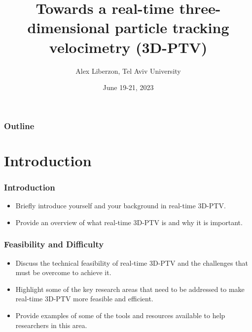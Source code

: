 \documentclass[aspectratio=43]{beamer}
\title{Towards a real-time three-dimensional particle tracking velocimetry (3D-PTV)}
\date{June 19-21, 2023}
\author[Liberzon]{Alex Liberzon, Tel Aviv University}
\begin{document}
\begin{frame}
    \titlepage
\end{frame}

\begin{frame}\frametitle{Outline}
    \begin{card}	
    \tableofcontents
    \end{card}
\end{frame}


\section{Introduction}

\begin{frame}
\frametitle{Introduction}
\begin{itemize}
\item Briefly introduce yourself and your background in real-time 3D-PTV.
\item Provide an overview of what real-time 3D-PTV is and why it is important.
\end{itemize}
\end{frame}







\begin{frame}
\frametitle{Feasibility and Difficulty}
\begin{itemize}
\item Discuss the technical feasibility of real-time 3D-PTV and the challenges that must be overcome to achieve it.
\item Highlight some of the key research areas that need to be addressed to make real-time 3D-PTV more feasible and efficient.
\item Provide examples of some of the tools and resources available to help researchers in this area.
\end{itemize}
\end{frame}
\end{document}
